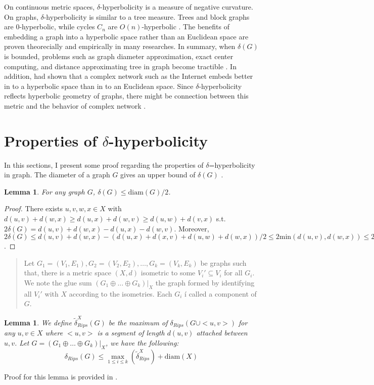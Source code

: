 \documentclass[a4paper,12pt]{article}
\newcommand*{\quoteTitle}[1]{{#1}\ignorespaces}%
\newenvironment{Quote}[1]{
    \medskip\par\noindent\quoteTitle{#1}
    \par\noindent
    \begin{quote}
    }{
    \end{quote}
    \par\noindent\ignorespacesafterend
}
\newtheorem{lemma}[theorem]{Lemma}
\begin{document}
On continuous metric spaces, $\delta$-hyperbolicity is a measure of negative curvature. On graphs, $\delta$-hyperbolicity is similar to a tree measure. Trees and block graphs are $0$-hyperbolic, while cycles $C_n$ are $O(n)$-hyperbolic \cite{23}. The benefits of embedding a graph into a hyperbolic space rather than an Euclidean space are proven theorecially and empirically in many researches. In summary, when $\delta(G)$ is bounded, problems such as graph diameter approximation, exact
center computing, and distance approximating tree in graph become tractible \cite{6,7,11}. In addition, \cite{21} had shown that a complex network such as the Internet embeds better in to a hyperbolic space than in to an Euclidean space. Since $\delta$-hyperbolicity reflects hyperbolic geometry of graphs, there might be connection between this metric and the behavior of complex network \cite{1}.

\section{Properties of $\delta$-hyperbolicity}
In this sections, I present some proof regarding the properties of $\delta$=hyperbolicity in graph. The diameter of a graph $G$ gives an upper bound of $\delta(G)$ \cite{1}.
\begin{lemma}
    For any graph $G$, $\delta(G) \leq \mbox{diam}(G) / 2$.
\end{lemma}
\begin{proof}
    There exists $u,v,w,x \in X$ with $d(u,v) + d(w,x) \geq d(u,x) + d(w,v) \geq d(u,w) + d(v,x)$ s.t. $2\delta(G) = d(u,v) + d(w,x) - d(u,x) - d(w,v)$.
    Moreover, $2\delta(G) \leq d(u,v) + d(w,x) - (d(u,x) + d(x,v) + d(u,w) + d(w,x)) / 2 \leq 2\mbox{min}(d(u,v), d(w,x)) \leq 2\mbox{diam}(G)$.
\end{proof}

\begin{Quote}{Glue sum of graphs}
    \setlength{\parskip}{0em}
    Let $G_1 = (V_1, E_1), G_2 = (V_2, E_2), \ldots, G_k = (V_k, E_k)$ be graphs such that, there is a metric space $(X,d)$ isometric to some $V_i' \subseteq V_i$ for all $G_i$. We note the glue sum $(G_1 \oplus \ldots \oplus G_k)|_X$ the graph formed by identifying all $V_i'$ with $X$ according to the isometries. Each $G_i$ í called a component of $G$.
\end{Quote}

\begin{lemma}
    We define $\tilde{\delta}_{Rips}^{X}(G)$ be the maximum of $\delta_{Rips}(G \cup <u,v>)$ for any $u, v \in X$ where $<u,v>$ is a segment of length $d(u,v)$ attached between $u,v$.
    Let $G = (G_1 \oplus \ldots \oplus G_k)|_X$, we have the following:
    $$ \delta_{Rips}(G) \leq \max_{1 \leq i \leq k}(\tilde{\delta}_{Rips}^X) + \mbox{diam}(X) $$
\end{lemma}
Proof for this lemma is provided in \cite{1}.
\end{document}
